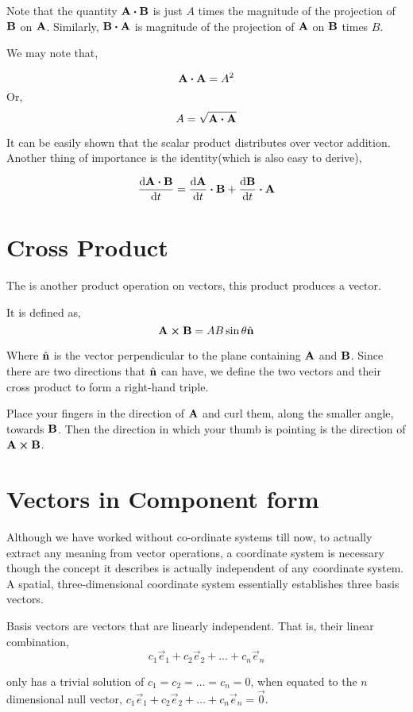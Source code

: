 Note that the quantity \(\Aa \dtp \BB\) is just \(A\) times 
the magnitude of the projection of \(\boldsymbol{\mathbf{B}}\) on \(\boldsymbol{\mathbf{A}}\). Similarly, \(\BB \dtp \Aa\) is
magnitude of the projection of \(\boldsymbol{\mathbf{A}}\) on \(\boldsymbol{\mathbf{B}}\) times \(B\).

We may note that,

\[\Aa \dtp \Aa = A^2\] Or,
\[A = \sqrt{\Aa \dtp \Aa}\]

It can be easily shown that the scalar product distributes over vector addition. 
Another thing of importance is the identity(which is also easy to derive),

\[\dv{\Aa \dtp \BB}{t} = \dv{\Aa}{t} \dtp \BB + \dv{\BB}{t} \dtp \Aa\]

\section{Cross Product}

The  is another product operation on vectors, this product produces a vector.

It is defined as, 
\[\Aa \cp \BB = AB\sin\theta \unitv{n}\] 

Where \({\hat{\boldsymbol{\mathbf{n}}}}\) is the vector perpendicular to the plane containing \(\boldsymbol{\mathbf{A}}\) and \(\boldsymbol{\mathbf{B}}\).
Since there are two directions that \({\hat{\boldsymbol{\mathbf{n}}}}\) can have, we define the two vectors 
and their cross product to form a right-hand triple.

Place your fingers in the direction of \(\boldsymbol{\mathbf{A}}\) and curl them, along the smaller angle, towards 
\(\boldsymbol{\mathbf{B}}\). Then the direction in which your thumb is pointing is the direction of \(\Aa \cp \BB\). 

\section{Vectors in Component form}

Although we have worked without co-ordinate systems till now,
to actually extract any meaning from vector operations, a coordinate system is necessary
though the concept it describes is actually independent of any coordinate
system.
A spatial, three-dimensional coordinate system essentially establishes
three basis vectors.

Basis vectors are vectors that are linearly independent. That is,
their linear combination, 
\[
    c_1\vec{e}_1 + c_2\vec{e}_2 + \dots + c_n\vec{e}_n\] 

only has a trivial solution of \(c_1 = c_2 = \dots = c_n = 0\), when equated to the \(n\) dimensional null
vector, \(c_1\vec{e}_1 + c_2\vec{e}_2 + \dots + c_n\vec{e}_n = \vec{0}\). 